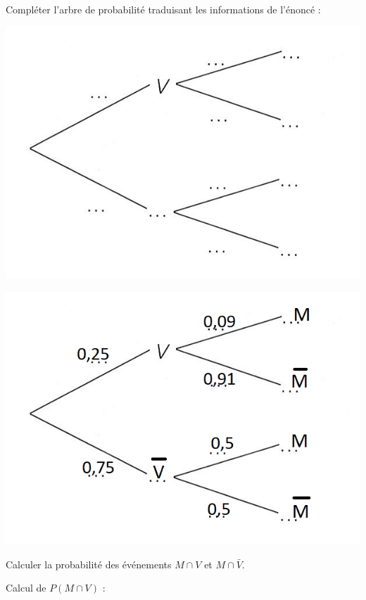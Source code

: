 \begin{questions}
	\question[2] Compléter l'arbre de probabilité traduisant les informations de l'énoncé :
	
	\begin{center}
		\includegraphics[scale=0.6]{arbre_pond}
	\end{center}

	\begin{solution}
		\begin{center}
			\includegraphics[scale=0.6]{arbre_pond2}
		\end{center}
	\end{solution}

	\question[1] Calculer la probabilité des événements $M \cap V$ et $M \cap \bar{V}$.
	\begin{solution}
		Calcul de $P(M \cap V)$ :
		

\end{solution}
\end{questions}
